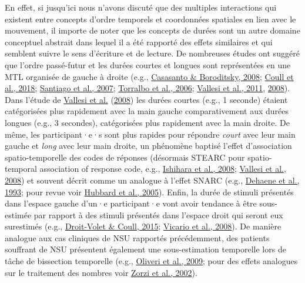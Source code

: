 \documentclass[
  a4paper,12pt,twoside,onecolumn,openright,final,oldfontcommands]{memoir}
\begin{document}
En effet, si jusqu'ici nous n'avons discuté que des multiples interactions qui existent entre concepts d'ordre temporels et coordonnées spatiales en lien avec le mouvement, il importe de noter que les concepts de durées sont un autre domaine conceptuel abstrait dans lequel il a été rapporté des effets similaires et qui semblent suivre le sens d'écriture et de lecture. De nombreuses études ont suggéré que l'ordre passé-futur et les durées courtes et longues sont représentées en une MTL organisée de gauche à droite (e.g., \protect\hyperlink{ref-casasanto_time_2008}{Casasanto \& Boroditsky, 2008}; \protect\hyperlink{ref-coull_mental_2018}{Coull et al., 2018}; \protect\hyperlink{ref-santiago_time_2007}{Santiago et al., 2007}; \protect\hyperlink{ref-torralbo_flexible_2006}{Torralbo et al., 2006}; \protect\hyperlink{ref-vallesi_how_2011}{Vallesi et al., 2011}, \protect\hyperlink{ref-vallesi_effect_2008}{2008}). Dans l'étude de \protect\hyperlink{ref-vallesi_effect_2008}{Vallesi et al.} (\protect\hyperlink{ref-vallesi_effect_2008}{2008}) les durées courtes (e.g., 1 seconde) étaient catégorisées plus rapidement avec la main gauche comparativement aux durées longues (e.g., 3 secondes), catégorisées plus rapidement avec la main droite. De même, les participant·e·s sont plus rapides pour répondre \emph{court} avec leur main gauche et \emph{long} avec leur main droite, un phénomène baptisé l'effet d'association spatio-temporelle des codes de réponses (désormais STEARC pour spatio-temporal association of response code, e.g., \protect\hyperlink{ref-ishihara_horizontal_2008}{Ishihara et al., 2008}; \protect\hyperlink{ref-vallesi_effect_2008}{Vallesi et al., 2008}) et souvent décrit comme un analogue à l'effet SNARC (e.g., \protect\hyperlink{ref-dehaene_mental_1993}{Dehaene et al., 1993}; pour revue voir \protect\hyperlink{ref-hubbard_interactions_2005}{Hubbard et al., 2005}). Enfin, la durée de stimuli présentés dans l'espace gauche d'un·e participant·e vont avoir tendance à être sous-estimée par rapport à des stimuli présentés dans l'espace droit qui seront eux surestimés (e.g., \protect\hyperlink{ref-droit-volet_developmental_2015}{Droit-Volet \& Coull, 2015}; \protect\hyperlink{ref-vicario_relativistic_2008}{Vicario et al., 2008}). De manière analogue aux cas cliniques de NSU rapportés précédemment, des patients souffrant de NSU présentent également une sous-estimation temporelle lors de tâche de bissection temporelle (e.g., \protect\hyperlink{ref-oliveri_representation_2009}{Oliveri et al., 2009}; pour des effets analogues sur le traitement des nombres voir \protect\hyperlink{ref-zorzi_neglect_2002}{Zorzi et al., 2002}).
\end{document}
